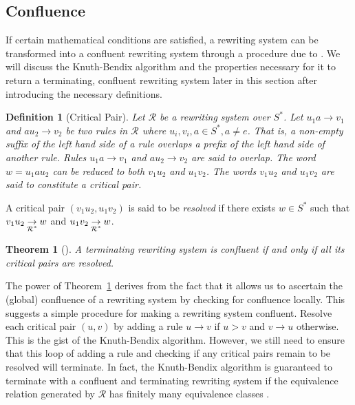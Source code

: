 \documentclass[12pt,a4paper]{amsart}
\newcommand{\id}{e}
\newcommand{\rws}{\mathcal{R}}
\newcommand{\writesto}{\rightarrow}
\newcommand{\writestoc}[1]{\underset{\mathclap{#1}}{\rightarrow}}
\numberwithin{equation}{section}
\newtheorem{definition}[prop]{Definition}
\newtheorem{theorem}[prop]{Theorem}
\begin{document}
\subsection{Confluence}
If certain mathematical conditions are satisfied, a rewriting system can be transformed into a confluent rewriting system through a procedure due to \citet{knuth1983simple}. We will discuss the Knuth-Bendix algorithm and the properties necessary for it to return a terminating, confluent rewriting system later in this section after introducing the necessary definitions.

\begin{definition}[Critical Pair]
Let $\rws$ be a rewriting system over $S^*$.
Let $u_1 a \writesto v_1$ and $a u_2 \writesto v_2$ be two rules in $\rws$ where $u_i, v_i, a \in S^*, a \neq \id$. That is, a non-empty suffix of the left hand side of a rule overlaps a prefix of the left hand side of another rule. Rules $u_1 a \writesto v_1$  and $a u_2 \writesto v_2$ are said to \emph{overlap}. The word $w = u_1au_2$ can be reduced to both $v_1u_2$ and $u_1 v_2$. The words $v_1u_2$ and $u_1 v_2$ are said to constitute a \emph{critical pair}.
\end{definition}

A critical pair $(v_1u_2, u_1 v_2)$ is said to be \emph{resolved} if there exists $w \in S^*$ such that $v_1u_2 \writestoc{\rws^*} w$ and $u_1 v_2 \writestoc{\rws^*} w$. 

\begin{theorem}[{\citep[Lemma 2.7.2]{baader1999term}}]
\label{thm:cpl}
A terminating rewriting system is confluent if and only if all its critical pairs are resolved.
\end{theorem}


The power of Theorem~\ref{thm:cpl} derives from the fact that it allows us to ascertain the (global) confluence of a rewriting system by checking for confluence locally. This suggests a simple procedure for making a rewriting system confluent. Resolve each critical pair $(u, v)$ by adding a rule $u \writesto v$ if $u > v$ and $v \writesto u$ otherwise. This is the gist of the Knuth-Bendix algorithm. However, we still need to ensure that this loop of adding a rule and checking if any critical pairs remain to be resolved will terminate. In fact, the Knuth-Bendix algorithm is guaranteed to terminate with a confluent and terminating rewriting system if the equivalence relation generated by $\rws$ has finitely many equivalence classes	 \citep[Corollary 12.21]{holt2005handbook}. 
\end{document}
